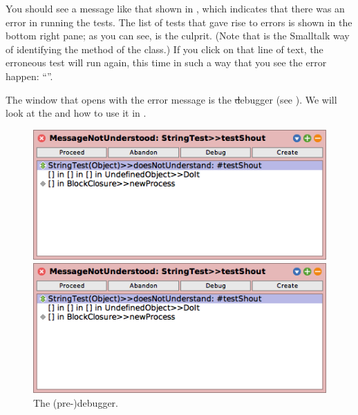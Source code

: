 \documentclass[a4paper,10pt,twoside]{book}
\begin{document}
You should see a message like that shown in , which indicates that there was an error in running the tests.  The list of tests that gave rise to errors is shown in the bottom right pane; as you can see,  is the culprit.
(Note that  is the Smalltalk way of identifying the  method of the  class.)
If you click on that line of text, the erroneous test will run again, this time in such a way that you see the error happen: ``''.

The window that opens with the error message is the \st debugger (see ).
We will look at the  and how to use it in .

\begin{figure}[hbt]
\ifluluelse
	{\centerline {\includegraphics[width=\textwidth]{Predebugger}}}
	{\centerline {\includegraphics[scale=0.7]{Predebugger}}}
\caption{The (pre-)debugger.}
\label{fig:predebugger}
\end{figure}
\end{document}
